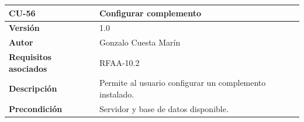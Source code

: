 \documentclass[
]{article}
\begin{document}
\begin{longtable}[]{@{}ll@{}}
\toprule
\begin{minipage}[b]{0.21\columnwidth}\raggedright
\textbf{CU-56}\strut
\end{minipage} & \begin{minipage}[b]{0.73\columnwidth}\raggedright
\textbf{Configurar complemento}\strut
\end{minipage}\tabularnewline
\midrule
\endhead
\begin{minipage}[t]{0.21\columnwidth}\raggedright
\textbf{Versión}\strut
\end{minipage} & \begin{minipage}[t]{0.73\columnwidth}\raggedright
1.0\strut
\end{minipage}\tabularnewline
\begin{minipage}[t]{0.21\columnwidth}\raggedright
\textbf{Autor}\strut
\end{minipage} & \begin{minipage}[t]{0.73\columnwidth}\raggedright
Gonzalo Cuesta Marín\strut
\end{minipage}\tabularnewline
\begin{minipage}[t]{0.21\columnwidth}\raggedright
\textbf{Requisitos asociados}\strut
\end{minipage} & \begin{minipage}[t]{0.73\columnwidth}\raggedright
RFAA-10.2\strut
\end{minipage}\tabularnewline
\begin{minipage}[t]{0.21\columnwidth}\raggedright
\textbf{Descripción}\strut
\end{minipage} & \begin{minipage}[t]{0.73\columnwidth}\raggedright
Permite al usuario configurar un complemento instalado.\strut
\end{minipage}\tabularnewline
\begin{minipage}[t]{0.21\columnwidth}\raggedright
\textbf{Precondición}\strut
\end{minipage} & \begin{minipage}[t]{0.73\columnwidth}\raggedright
Servidor y base de datos disponible.


\end{minipage}
\end{longtable}
\end{document}
